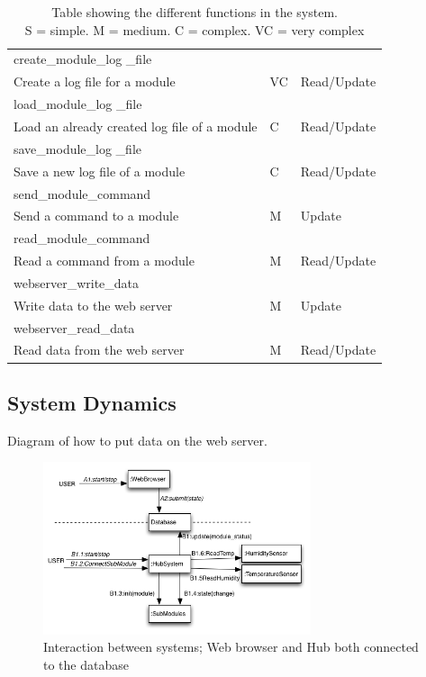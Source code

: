 \begin{table}[H]
\begin{tabular}{| p{11cm} | p{2cm} | p{3cm} |}
	create\_module\_log	\_file 					&&
	\\ Create a log file for a module					& VC				& Read/Update		\\ \hline
	load\_module\_log	\_file 					&&
	\\ Load an already created log file of a module		& C				& Read/Update		\\ \hline
	save\_module\_log	\_file 					&&
	\\ Save a new log file of a module				& C				& Read/Update		\\ \hline
	send\_module\_command 					&&
	\\ Send a command to a module				& M				& Update			\\ \hline
	read\_module\_command 					&&
	\\ Read a command from a module				& M				& Read/Update		\\ \hline	
	webserver\_write\_data	 					&&
	\\ Write data to the web server					& M				& Update			\\ \hline	
	webserver\_read\_data 						&&
	\\ Read data from the web server				& M				& Read/Update		\\ \hline	
	\end{tabular}
	\caption{Table showing the different functions in the system. \\S = simple. M = medium. C = complex. VC = very complex}
	\label{Function_table}
\end{table}

\subsection{System Dynamics}
Diagram of how to put data on the web server.
\begin{figure}[H]
	\begin{centering}
		\includegraphics[width=0.7\textwidth]{images/communication_diagram.png}
		\caption{Interaction between systems; Web browser and Hub both connected to the database}
 	\end{centering}
\end{figure}		

